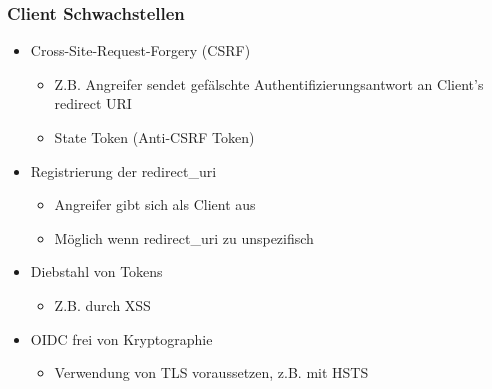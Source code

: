 \documentclass{beamer}
\begin{document}
\begin{frame}
\frametitle{Client Schwachstellen}
\begin{itemize}
\item Cross-Site-Request-Forgery (CSRF)
	\begin{itemize}
	\item Z.B. Angreifer sendet gefälschte Authentifizierungsantwort an Client's redirect URI
	\item State Token (Anti-CSRF Token)
	\end{itemize}
\item Registrierung der redirect\_uri
	\begin{itemize}
	\item Angreifer gibt sich als Client aus
	\item Möglich wenn redirect\_uri zu unspezifisch
	\end{itemize}
\item Diebstahl von Tokens 
	\begin{itemize}
	\item Z.B. durch XSS
	\end{itemize}
\item OIDC frei von Kryptographie
	\begin{itemize}
	\item Verwendung von TLS voraussetzen, z.B. mit HSTS
	\end{itemize}
\end{itemize}
\end{frame}
\end{document}
